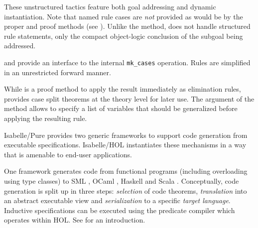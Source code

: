 \begin{isabellebody}
\begin{isamarkuptext}
\begin{description}
  These unstructured tactics feature both goal addressing and dynamic
  instantiation.  Note that named rule cases are \emph{not} provided
  as would be by the proper \hyperlink{method.cases}{\mbox{}} and \hyperlink{method.induct}{\mbox{}} proof
  methods (see ).  Unlike the \hyperlink{method.induct}{\mbox{}} method, \hyperlink{method.induct-tac}{\mbox{}} does not handle structured rule
  statements, only the compact object-logic conclusion of the subgoal
  being addressed.

  \item \hyperlink{method.HOL.ind-cases}{\mbox{}} and \hyperlink{command.HOL.inductive-cases}{\mbox{}} provide an interface to the internal \verb|mk_cases| operation.  Rules are simplified in an unrestricted
  forward manner.

  While \hyperlink{method.HOL.ind-cases}{\mbox{}} is a proof method to apply the
  result immediately as elimination rules, \hyperlink{command.HOL.inductive-cases}{\mbox{}} provides case split theorems at the theory level
  for later use.  The \hyperlink{keyword.for}{\mbox{}} argument of the \hyperlink{method.HOL.ind-cases}{\mbox{}} method allows to specify a list of variables that should
  be generalized before applying the resulting rule.

  \end{description}%
\end{isamarkuptext}%
\isamarkuptrue%
%
\isamarkuptrue%
%
\begin{isamarkuptext}%
Isabelle/Pure provides two generic frameworks to support code
  generation from executable specifications.  Isabelle/HOL
  instantiates these mechanisms in a way that is amenable to end-user
  applications.

  \medskip One framework generates code from functional programs
  (including overloading using type classes) to SML \cite{SML}, OCaml
  \cite{OCaml}, Haskell \cite{haskell-revised-report} and Scala
  \cite{scala-overview-tech-report}.
  Conceptually, code generation is split up in three steps:
  \emph{selection} of code theorems, \emph{translation} into an
  abstract executable view and \emph{serialization} to a specific
  \emph{target language}.  Inductive specifications can be executed
  using the predicate compiler which operates within HOL.
  See \cite{isabelle-codegen} for an introduction.


\end{isamarkuptext}
\end{isabellebody}
